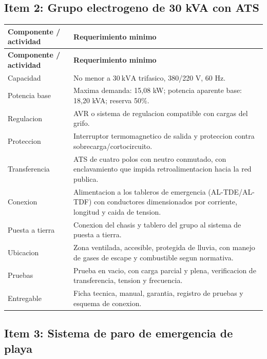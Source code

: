 \documentclass[12pt,letterpaper]{report}
\newcommand{\reqheader}{\rowcolor{azulunap!14}}
\begin{document}
\subsection{Item 2: Grupo electrogeno de 30 kVA con ATS}

\begin{longtable}{P{0.30\textwidth} P{0.62\textwidth}}
\toprule
\reqheader \textbf{Componente / actividad} & \textbf{Requerimiento minimo} \\
\midrule
\endfirsthead
\toprule
\reqheader \textbf{Componente / actividad} & \textbf{Requerimiento minimo} \\
\midrule
\endhead
Capacidad & No menor a \(30\ \text{kVA}\) trifasico, 380/220 V, 60 Hz. \\
Potencia base & Maxima demanda: 15,08 kW; potencia aparente base: 18,20 kVA; reserva 50\%. \\
Regulacion & AVR o sistema de regulacion compatible con cargas del grifo. \\
Proteccion & Interruptor termomagnetico de salida y proteccion contra sobrecarga/cortocircuito. \\
Transferencia & ATS de cuatro polos con neutro conmutado, con enclavamiento que impida retroalimentacion hacia la red publica. \\
Conexion & Alimentacion a los tableros de emergencia (AL-TDE/AL-TDF) con conductores dimensionados por corriente, longitud y caida de tension. \\
Puesta a tierra & Conexion del chasis y tablero del grupo al sistema de puesta a tierra. \\
Ubicacion & Zona ventilada, accesible, protegida de lluvia, con manejo de gases de escape y combustible segun normativa. \\
Pruebas & Prueba en vacio, con carga parcial y plena, verificacion de transferencia, tension y frecuencia. \\
Entregable & Ficha tecnica, manual, garantia, registro de pruebas y esquema de conexion. \\
\bottomrule
\end{longtable}

\subsection{Item 3: Sistema de paro de emergencia de playa}
\end{document}
